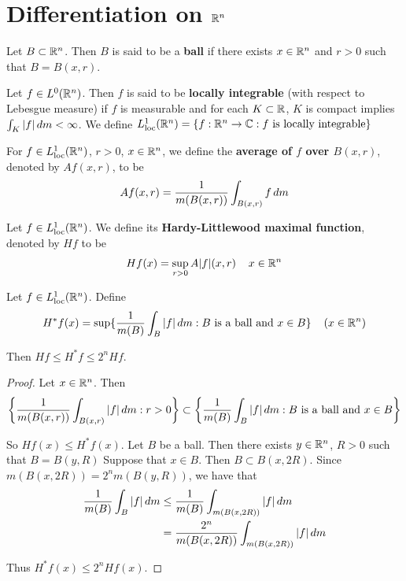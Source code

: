 \documentclass{book}
\begin{document}
	


	
	
	\newpage
	\section{Differentiation on $\mathbb{R}^n$}
	
	\begin{defn}  
		Let $B \subset \mathbb{R}^n$. Then $B$ is said to be a \textbf{ball} if there exists $x \in \mathbb{R}^n$ and $r > 0$ such that $B = B(x, r)$. 
	\end{defn}
	
	\begin{defn}  
		Let $f \in L^0(\mathbb{R}^n)$. Then $f$ is said to be \textbf{locally integrable} (with respect to Lebesgue measure) if $f$ is measurable and for each $K \subset \mathbb{R}$, $K$ is compact implies $\int_K |f| \, d m < \infty$. We define $L^1_{\text{loc}}(\mathbb{R}^n) = \{f:\mathbb{R}^n \rightarrow \mathbb{C}: f \text{ is locally integrable}\}$
	\end{defn}
	
	\begin{defn}  
		For $f \in L^1_{\text{loc}}(\mathbb{R}^n)$, $r>0$, $x \in \mathbb{R}^n$, we define the \textbf{average of $f$ over $B(x,r)$}, denoted by $Af(x,r)$, to be $$Af(x,r) = \frac{1}{m(B(x,r))}\int_{B(x,r)}f\, d m$$
	\end{defn}

	\begin{defn}  
		Let $f \in L^1_{\text{loc}}(\mathbb{R}^n)$. We define its \textbf{Hardy-Littlewood maximal function}, denoted by $Hf$ to be $$Hf(x) = \sup\limits_{r>0} A|f|(x,r) \hspace{4mm} x \in \mathbb{R}^n$$
	\end{defn}
	
	\begin{ex}  
		Let $f \in L^1_{\text{loc}}(\mathbb{R}^n)$. Define $$H^*f(x) = \sup\{\frac{1}{m(B)}\int_{B}|f|\, d m: B \text{ is a ball and } x \in B\} \hspace{4mm} (x \in \mathbb{R}^n)$$
		
		Then $Hf \leq H^*f \leq 2^n Hf$. 
	\end{ex}
	
	\begin{proof}
		Let $x \in \mathbb{R}^n$. Then $$\bigg \{ \frac{1}{m(B(x,r))}\int_{B(x,r)}|f|\, d m: r >0\bigg \} \subset \bigg\{ \frac{1}{m(B)}\int_{B}|f|\, d m: B \text{ is a ball and } x \in B \bigg\} $$
		
		So $Hf(x) \leq H^*f(x)$. Let $B$ be a ball. Then there exists $y \in \mathbb{R}^n$, $R>0$ such that $B = B(y,R)$ Suppose that $x \in B$. Then $B \subset B(x,2R)$. Since $m(B(x,2R)) = 2^n m(B(y,R))$, we have that 
		\begin{align*}
			\frac{1}{m(B)}\int_{B}|f|\, d m
			& \leq \frac{1}{m(B)} \int_{m(B(x,2R))}|f|\, d m\\
			&= \frac{2^n}{m(B(x,2R))} \int_{m(B(x,2R))}|f|\, d m
		\end{align*}
		
		Thus $H^*f(x) \leq 2^n Hf(x)$.
	\end{proof}
	
\end{document}
